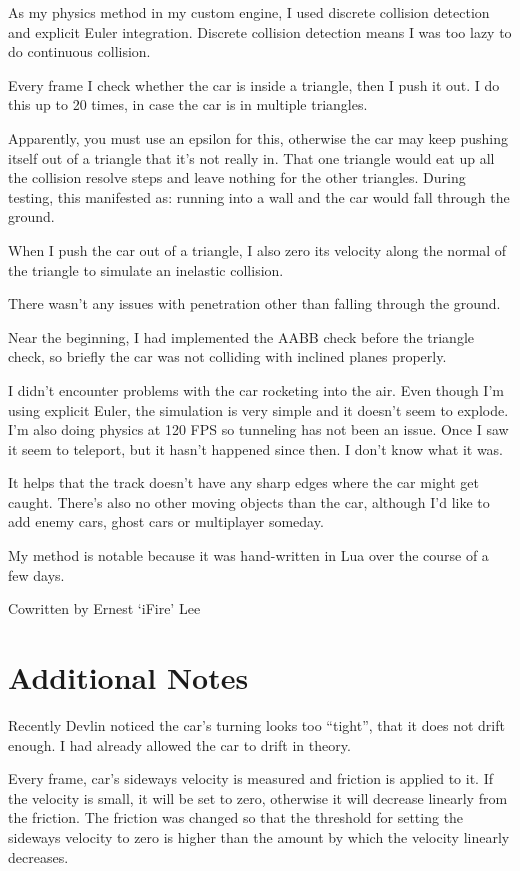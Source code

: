 \documentclass[]{book}
\begin{document}
As my physics method in my custom engine, I used discrete collision
detection and explicit Euler integration. Discrete collision detection
means I was too lazy to do continuous collision.

Every frame I check whether the car is inside a triangle, then I push it
out. I do this up to 20 times, in case the car is in multiple triangles.

Apparently, you must use an epsilon for this, otherwise the car may keep
pushing itself out of a triangle that it's not really in. That one
triangle would eat up all the collision resolve steps and leave nothing
for the other triangles. During testing, this manifested as: running
into a wall and the car would fall through the ground.

When I push the car out of a triangle, I also zero its velocity along
the normal of the triangle to simulate an inelastic collision.

There wasn't any issues with penetration other than falling through the
ground.

Near the beginning, I had implemented the AABB check before the triangle
check, so briefly the car was not colliding with inclined planes
properly.

I didn't encounter problems with the car rocketing into the air. Even
though I'm using explicit Euler, the simulation is very simple and it
doesn't seem to explode. I'm also doing physics at 120 FPS so tunneling
has not been an issue. Once I saw it seem to teleport, but it hasn't
happened since then. I don't know what it was.

It helps that the track doesn't have any sharp edges where the car might
get caught. There's also no other moving objects than the car, although
I'd like to add enemy cars, ghost cars or multiplayer someday.

My method is notable because it was hand-written in Lua over the course
of a few days.

Cowritten by Ernest `iFire' Lee

\section{Additional Notes}\label{additional-notes}

Recently Devlin noticed the car's turning looks too ``tight'', that it
does not drift enough. I had already allowed the car to drift in theory.

Every frame, car's sideways velocity is measured and friction is applied
to it. If the velocity is small, it will be set to zero, otherwise it
will decrease linearly from the friction. The friction was changed so
that the threshold for setting the sideways velocity to zero is higher
than the amount by which the velocity linearly decreases.
\end{document}
